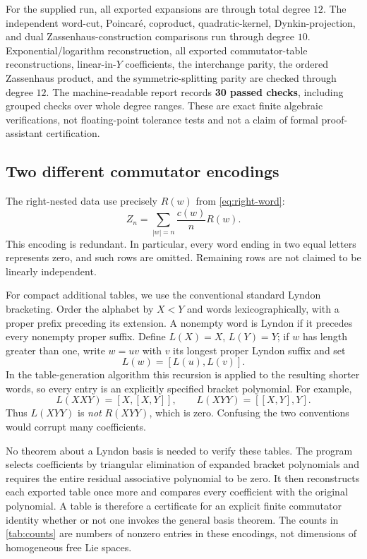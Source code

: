 For the supplied run, all exported expansions are through total degree $12$. The independent word-cut, Poincar\'e, coproduct, quadratic-kernel, Dynkin-projection, and dual Zassenhaus-construction comparisons run through degree $10$. Exponential/logarithm reconstruction, all exported commutator-table reconstructions, linear-in-$Y$ coefficients, the interchange parity, the ordered Zassenhaus product, and the symmetric-splitting parity are checked through degree $12$. The machine-readable report records \textbf{30 passed checks}, including grouped checks over whole degree ranges. These are exact finite algebraic verifications, not floating-point tolerance tests and not a claim of formal proof-assistant certification.

\subsection{Two different commutator encodings}
The right-nested data use precisely $R(w)$ from \cref{eq:right-word}:
\begin{equation}
 Z_n=\sum_{|w|=n}\frac{c(w)}n R(w).
\end{equation}
This encoding is redundant. In particular, every word ending in two equal letters represents zero, and such rows are omitted. Remaining rows are not claimed to be linearly independent.

For compact additional tables, we use the conventional standard Lyndon bracketing. Order the alphabet by $X<Y$ and words lexicographically, with a proper prefix preceding its extension. A nonempty word is Lyndon if it precedes every nonempty proper suffix. Define $L(X)=X$, $L(Y)=Y$; if $w$ has length greater than one, write $w=uv$ with $v$ its longest proper Lyndon suffix and set
\begin{equation}\label{eq:lyndon-definition}
 L(w)=[L(u),L(v)].
\end{equation}
In the table-generation algorithm this recursion is applied to the resulting shorter words, so every entry is an explicitly specified bracket polynomial. For example,
\begin{equation}
 L(XXY)=[X,[X,Y]],\qquad
 L(XYY)=[[X,Y],Y].
\end{equation}
Thus $L(XYY)$ is \emph{not} $R(XYY)$, which is zero. Confusing the two conventions would corrupt many coefficients.

No theorem about a Lyndon basis is needed to verify these tables. The program selects coefficients by triangular elimination of expanded bracket polynomials and requires the entire residual associative polynomial to be zero. It then reconstructs each exported table once more and compares every coefficient with the original polynomial. A table is therefore a certificate for an explicit finite commutator identity whether or not one invokes the general basis theorem. The counts in \cref{tab:counts} are numbers of nonzero entries in these encodings, not dimensions of homogeneous free Lie spaces.

